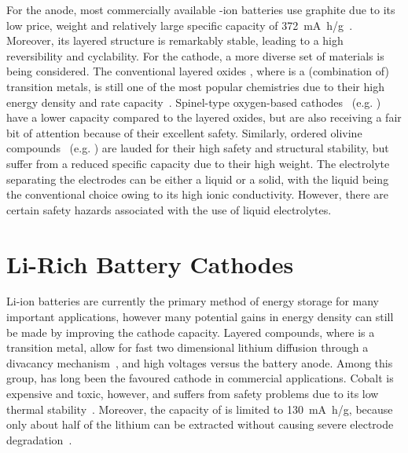 \begin{refsection}
 
For the anode, most commercially available -ion batteries use graphite 
due to its low price, weight and relatively large specific capacity of 
372~\si{\milli\ampere\hour/\gram}~\cite{Mao2018}. Moreover, its layered 
structure is remarkably stable, leading to  a high reversibility and 
cyclability. For the cathode, a more diverse set of materials is being 
considered. The conventional layered oxides , where  is a 
(combination of) transition metals, is still one of the most popular 
chemistries due to their high energy density and rate capacity~\cite{Bresser2015}. Spinel-type 
oxygen-based cathodes~\cite{Thackeray2004} (e.g. ) have a lower capacity compared to 
the layered oxides, but are also receiving a fair bit of attention because of 
their excellent safety. Similarly, ordered olivine compounds~\cite{Padhi1997} (e.g. ) are lauded for their 
high safety and structural stability, but suffer from a reduced specific 
capacity due to their high weight. The electrolyte separating the electrodes 
can be either a liquid or a solid, 
with the liquid being the conventional choice owing to its high ionic 
conductivity. However, there are certain safety hazards associated with the 
use of liquid electrolytes. 

\section{Li-Rich Battery Cathodes} \label{batteries:sec-lirich} 
 
Li-ion batteries are currently the primary method of energy storage for many 
important applications, however many potential gains in energy density can 
still be made by improving the cathode capacity. Layered  compounds, 
where  is a transition metal, allow for fast two dimensional lithium 
diffusion through a divacancy mechanism~\cite{VanderVen2001}, and high 
voltages versus the battery anode. Among this group,  has long been 
the favoured cathode in commercial applications. Cobalt is expensive and 
toxic, however, and  suffers from safety problems due to its low thermal 
stability~\cite{Larcher2015}. Moreover, the capacity of  is limited 
to 130~\si{\milli\ampere\hour/\gram}, because only about half of the lithium 
can be extracted without causing severe electrode 
degradation~\cite{Rozier2015}. 
 

\end{refsection}

